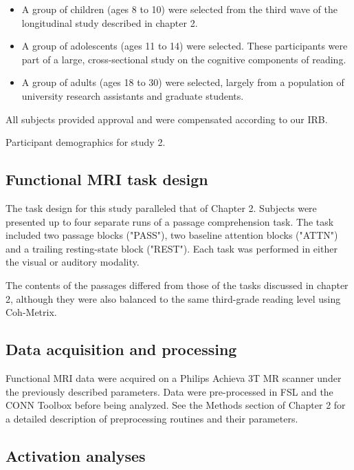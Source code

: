 \begin{itemize}
	\item A group of children (ages 8 to 10) were selected from the third wave of the longitudinal study described in chapter 2. 
	\item A group of adolescents (ages 11 to 14) were selected. These participants were part of a large, cross-sectional study on the cognitive components of reading.
	\item A group of adults (ages 18 to 30) were selected, largely from a population of university research assistants and graduate students.
\end{itemize}

All subjects provided approval and were compensated according to our IRB.

\begin{table}[t]
	\renewcommand{\tabcolsep}{0.09cm}
	\centering
	
	\caption{Participant demographics for study 2.}
	\label{table:ch4-participants}
\end{table}

\subsection{Functional MRI task design}

The task design for this study paralleled that of Chapter 2. Subjects were presented up to four separate runs of a passage comprehension task. The task included two passage blocks ("PASS"), two baseline attention blocks ("ATTN") and a trailing resting-state block ("REST"). Each task was performed in either the visual or auditory modality.

The contents of the passages differed from those of the tasks discussed in chapter 2, although they were also balanced to the same third-grade reading level using Coh-Metrix. 

\subsection{Data acquisition and processing}

Functional MRI data were acquired on a Philips Achieva 3T MR scanner under the previously described parameters. Data were pre-processed in FSL and the CONN Toolbox before being analyzed. See the Methods section of Chapter 2 for a detailed description of preprocessing routines and their parameters.

\subsection{Activation analyses}

